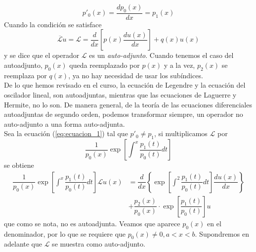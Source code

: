 \begin{equation}
p'_{0}(x) = \dfrac{d p_{0}(x)}{dx} = p_{1}(x) \label{eq:ecuacion_3}
\end{equation}
Cuando la condición se satisface
\begin{equation}
\overline{\mathscr{L}} u = \mathscr{L} = \dfrac{d}{dx} \left[ p(x) \dfrac{d u(x)}{dx} \right] + q(x) u(x)
\label{eq:ecuacion_4}
\end{equation}
y se dice que el operador $\mathscr{L}$ es un \emph{auto-adjunto}. Cuando tenemos el caso del autoadjunto, $p_{0}(x)$ queda reemplazado por $p(x)$ y a la vez, $p_{2}(x)$ se reemplaza por $q(x)$, ya no hay necesidad de usar los subíndices.
\\
De lo que hemos revisado en el curso, la ecuación de Legendre y la ecuación del oscilador lineal, son autoadjuntas, mientras que las ecuaciones de Laguerre y Hermite, no lo son. De manera general, de la teoría de las ecuaciones diferenciales autoadjuntas de segundo orden, podemos transformar siempre, un operador no auto-adjunto a una forma auto-adjunta.
\\
Sea la ecuación (\ref{eq:ecuacion_1}) tal que $p'_{0}\neq p_{1}$, si multiplicamos $\mathscr{L}$ por
\[ \dfrac{1}{p_{0} (x)} \exp \left[ \int^{x} \dfrac{p_{1}(t)}{p_{0}(t)} dt \right] \]
se obtiene
\begin{equation}
\begin{split}
\dfrac{1}{p_{0} (x)} \exp \left[ \int^{x} \dfrac{p_{1}(t)}{p_{0}(t)} dt \right] \mathscr{L} u (x) &= \dfrac{d}{dx} \left\lbrace \exp \left[ \int^{2} \dfrac{p_{1}(t)}{p_{0}(t)} dt \right] \dfrac{du(x)}{dx} \right\rbrace \\
&+ \dfrac{p_{2}(x)}{p_{0}(x)} \cdot \exp \left[ \dfrac{p_{1}(t)}{p_{0}(t)} \right] u
\end{split}
\end{equation}
que como se nota, no es autoadjunta. Veamos que aparece $p_{0}(x)$ en el denominador, por lo que se requiere que $p_{0}(x) \neq 0, a < x < b$. Supondremos en adelante que $\mathscr{L}$ se muestra como auto-adjunto.
